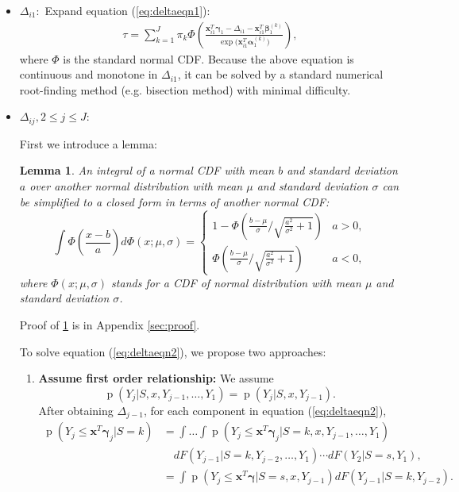 \documentclass[12pt]{article}
\newtheorem{lem}[thm]{Lemma}
\DeclareMathOperator{\pr}{p}
\begin{document}
\begin{itemize}
\item \textbf{$\Delta_{i1}: $} Expand equation (\ref{eq:deltaeqn1}):
  \begin{align*}
    \tau = \sum_{k = 1}^J \pi_k \Phi \left( \frac{\bm x_{i1}^T \bm
        \gamma_1 - \Delta_{i1} - \bm x_{i1}^T\bm \beta_1^{(k)}}{\exp
        \big( \bm x_{i1}^T \bm \alpha_1^{(k)} \big)} \right),
  \end{align*}
  where $\Phi$ is the standard normal CDF. Because the above equation
  is continuous and monotone in $\Delta_{i1}$, it can be solved by a
  standard numerical root-finding method (e.g. bisection method) with
  minimal difficulty.

\item \textbf{$\Delta_{ij}, 2\leq j \leq J: $}

  First we introduce a lemma:
  \begin{lem}\label{sec:lemma}
    An integral of a normal CDF with mean $b$ and standard deviation
    $a$ over another normal distribution with mean $\mu$ and standard
    deviation $\sigma$ can be simplified to a closed form in terms of
    another normal CDF:
    \begin{equation}
      \label{eq:lem}
      \int \Phi \left( \frac{x-b}{a} \right) d\Phi(x; \mu, \sigma)  = 
      \begin{cases}
        1- \Phi \left( \frac{b-\mu}{\sigma} \big / \sqrt{\frac{a^2}{\sigma^2}+1} \right) & a > 0, \\
        \Phi \left( \frac{b-\mu}{\sigma} \big /
          \sqrt{\frac{a^2}{\sigma^2}+1} \right) & a < 0 ,
      \end{cases}
    \end{equation}
    where $\Phi(x; \mu, \sigma)$ stands for a CDF of normal
    distribution with mean $\mu$ and standard deviation $\sigma$.
  \end{lem}
  Proof of \ref{sec:lemma} is in Appendix \ref{sec:proof}.

  To solve equation (\ref{eq:deltaeqn2}), we propose two approaches:

  \begin{enumerate}
  \item \textbf{Assume first order relationship:} We assume
    \begin{equation*}
      \pr (Y_j|S, x, Y_{j-1}, \ldots, Y_1) = \pr (Y_j|S, x, Y_{j-1}).
    \end{equation*}
    After obtaining $\Delta_{j-1}$, for each component in equation
    (\ref{eq:deltaeqn2}),
    \begin{align*}
      \pr (Y_j \leq \bm x^T \bm \gamma_j | S = k) & = \int\dots\int
      \pr (Y_j \leq \bm x^T\bm \gamma_j | S=k, x, Y_{j-1}, \ldots, Y_1)\\
      & \quad  dF(Y_{j-1}|S=k, Y_{j-2}, \ldots, Y_1)\cdots dF(Y_2|S=s, Y_1),\\
      & = \int \pr (Y_j \leq \bm x^T \bm \gamma | S=s, x, Y_{j-1})
      dF(Y_{j-1}|S=k, Y_{j-2}).
    \end{align*}


\end{enumerate}
\end{itemize}
\end{document}
